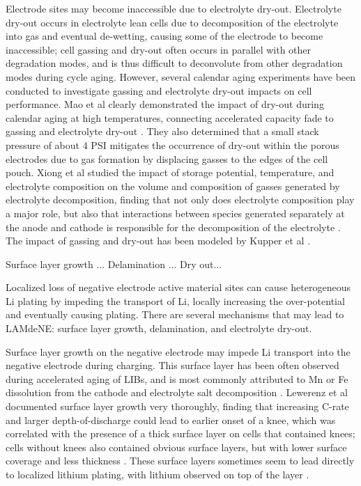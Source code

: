 \documentclass{article}
\begin{document}
Electrode sites may become inaccessible due to electrolyte dry-out. Electrolyte dry-out occurs in electrolyte lean cells due to decomposition of the electrolyte into gas and eventual de-wetting, causing some of the electrode to become inaccessible; cell gassing and dry-out often occurs in parallel with other degradation modes, and is thus difficult to deconvolute from other degradation modes during cycle aging. However, several calendar aging experiments have been conducted to investigate gassing and electrolyte dry-out impacts on cell performance. Mao et al clearly demonstrated the impact of dry-out during calendar aging at high temperatures, connecting accelerated capacity fade to gassing and electrolyte dry-out \cite{mao_calendar_2017}. They also determined that a small stack pressure of about 4 PSI mitigates the occurrence of dry-out within the porous electrodes due to gas formation by displacing gasses to the edges of the cell pouch. Xiong et al studied the impact of storage potential, temperature, and electrolyte composition on the volume and composition of gasses generated by electrolyte decomposition, finding that not only does electrolyte composition play a major role, but also that interactions between species generated separately at the anode and cathode is responsible for the decomposition of the electrolyte \cite{xiong_studies_2017}.
The impact of gassing and dry-out has been modeled by Kupper et al \cite{kupper_end--life_2018}.

Surface layer growth ...
Delamination ...
Dry out...

Localized loss of negative electrode active material sites can cause heterogeneous Li plating by impeding the transport of Li, locally increasing the over-potential and eventually causing plating. There are several mechanisms that may lead to LAMdeNE: surface layer growth, delamination, and electrolyte dry-out.

Surface layer growth on the negative electrode may impede Li transport into the negative electrode during charging. This surface layer has been often observed during accelerated aging of LIBs, and is most commonly attributed to Mn or Fe dissolution from the cathode and electrolyte salt decomposition \cite{lewerenz_post-mortem_2017,lewerenz_systematic_2017,zhu_investigation_2021,stiaszny_electrochemical_2014,rahe_nanoscale_2019,keil_linear_2019,sarasketa-zabala_understanding_2015, willenberg_high-precision_2020}. Lewerenz et al documented surface layer growth very thoroughly, finding that increasing C-rate and larger depth-of-discharge could lead to earlier onset of a knee, which was correlated with the presence of a thick surface layer on cells that contained knees; cells without knees also contained obvious surface layers, but with lower surface coverage and less thickness \cite{lewerenz_post-mortem_2017,lewerenz_systematic_2017}. These surface layers sometimes seem to lead directly to localized lithium plating, with lithium observed on top of the layer \cite{zhu_investigation_2021}.
\end{document}

